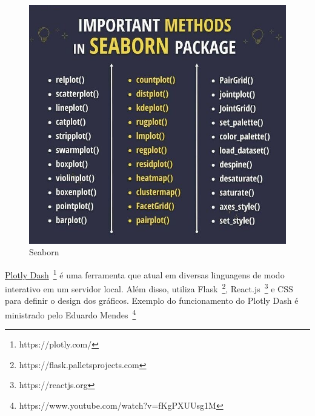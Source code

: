 \begin{figure}[!htp]
    \centering
    \includegraphics[scale=.5]{../img/python/seaborn.jpeg}
    \caption{Seaborn}
    \label{img:seaborn}
\end{figure}

\underline{Plotly Dash}~\footnote{https://plotly.com/} é uma ferramenta que atual em diversas linguagens de modo interativo em um servidor local.
Além disso, utiliza Flask~\footnote{https://flask.palletsprojects.com}, React.js~\footnote{https://reactjs.org} e CSS para definir o design dos gráficos.
Exemplo do funcionamento do Plotly Dash é ministrado pelo Eduardo Mendes~\footnote{https://www.youtube.com/watch?v=fKgPXUUsg1M}

